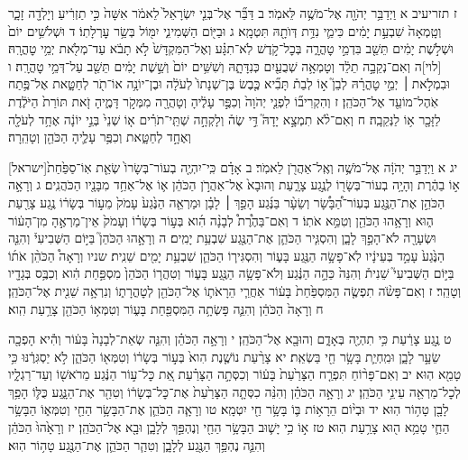 \documentclass[twoside, openany, parskip=half, 11pt]{book}
\begin{document}
ז תזריעיב א וַיְדַבֵּ֥ר יְהֹוָ֖ה אֶל־מֹשֶׁ֥ה לֵּאמֹֽר׃ ב דַּבֵּ֞ר אֶל־בְּנֵ֤י יִשְׂרָאֵל֙ לֵאמֹ֔ר אִשָּׁה֙ כִּ֣י תַזְרִ֔יעַ וְיָלְדָ֖ה זָכָ֑ר וְטָֽמְאָה֙ שִׁבְעַ֣ת יָמִ֔ים כִּימֵ֛י נִדַּ֥ת דְּוֺתָ֖הּ תִּטְמָֽא׃ ג וּבַיּ֖וֹם הַשְּׁמִינִ֑י יִמּ֖וֹל בְּשַׂ֥ר עׇרְלָתֽוֹ׃ ד וּשְׁלֹשִׁ֥ים יוֹם֙ וּשְׁלֹ֣שֶׁת יָמִ֔ים תֵּשֵׁ֖ב בִּדְמֵ֣י טׇהֳרָ֑ה בְּכׇל־קֹ֣דֶשׁ לֹֽא־תִגָּ֗ע וְאֶל־הַמִּקְדָּשׁ֙ לֹ֣א תָבֹ֔א עַד־מְלֹ֖את יְמֵ֥י טׇהֳרָֽהּ׃ [לוי]ה וְאִם־נְקֵבָ֣ה תֵלֵ֔ד וְטָמְאָ֥ה שְׁבֻעַ֖יִם כְּנִדָּתָ֑הּ וְשִׁשִּׁ֥ים יוֹם֙ וְשֵׁ֣שֶׁת יָמִ֔ים תֵּשֵׁ֖ב עַל־דְּמֵ֥י טׇהֳרָֽה׃ ו וּבִמְלֹ֣את ׀ יְמֵ֣י טׇהֳרָ֗הּ לְבֵן֮ א֣וֹ לְבַת֒ תָּבִ֞יא כֶּ֤בֶשׂ בֶּן־שְׁנָתוֹ֙ לְעֹלָ֔ה וּבֶן־יוֹנָ֥ה אוֹ־תֹ֖ר לְחַטָּ֑את אֶל־פֶּ֥תַח אֹֽהֶל־מוֹעֵ֖ד אֶל־הַכֹּהֵֽן׃ ז וְהִקְרִיב֞וֹ לִפְנֵ֤י יְהֹוָה֙ וְכִפֶּ֣ר עָלֶ֔יהָ וְטָהֲרָ֖ה מִמְּקֹ֣ר דָּמֶ֑יהָ זֹ֤את תּוֹרַת֙ הַיֹּלֶ֔דֶת לַזָּכָ֖ר א֥וֹ לַנְּקֵבָֽה׃ ח וְאִם־לֹ֨א תִמְצָ֣א יָדָהּ֮ דֵּ֣י שֶׂה֒ וְלָקְחָ֣ה שְׁתֵּֽי־תֹרִ֗ים א֤וֹ שְׁנֵי֙ בְּנֵ֣י יוֹנָ֔ה אֶחָ֥ד לְעֹלָ֖ה וְאֶחָ֣ד לְחַטָּ֑את וְכִפֶּ֥ר עָלֶ֛יהָ הַכֹּהֵ֖ן וְטָהֵֽרָה׃

[ישראל]יג א וַיְדַבֵּ֣ר יְהֹוָ֔ה אֶל־מֹשֶׁ֥ה וְאֶֽל־אַהֲרֹ֖ן לֵאמֹֽר׃ ב אָדָ֗ם כִּֽי־יִהְיֶ֤ה בְעוֹר־בְּשָׂרוֹ֙ שְׂאֵ֤ת אֽוֹ־סַפַּ֙חַת֙ א֣וֹ בַהֶ֔רֶת וְהָיָ֥ה בְעוֹר־בְּשָׂר֖וֹ לְנֶ֣גַע צָרָ֑עַת וְהוּבָא֙ אֶל־אַהֲרֹ֣ן הַכֹּהֵ֔ן א֛וֹ אֶל־אַחַ֥ד מִבָּנָ֖יו הַכֹּהֲנִֽים׃ ג וְרָאָ֣ה הַכֹּהֵ֣ן אֶת־הַנֶּ֣גַע בְּעֽוֹר־הַ֠בָּשָׂ֠ר וְשֵׂעָ֨ר בַּנֶּ֜גַע הָפַ֣ךְ ׀ לָבָ֗ן וּמַרְאֵ֤ה הַנֶּ֙גַע֙ עָמֹק֙ מֵע֣וֹר בְּשָׂר֔וֹ נֶ֥גַע צָרַ֖עַת ה֑וּא וְרָאָ֥הוּ הַכֹּהֵ֖ן וְטִמֵּ֥א אֹתֽוֹ׃ ד וְאִם־בַּהֶ֩רֶת֩ לְבָנָ֨ה הִ֜וא בְּע֣וֹר בְּשָׂר֗וֹ וְעָמֹק֙ אֵין־מַרְאֶ֣הָ מִן־הָע֔וֹר וּשְׂעָרָ֖ה לֹא־הָפַ֣ךְ לָבָ֑ן וְהִסְגִּ֧יר הַכֹּהֵ֛ן אֶת־הַנֶּ֖גַע שִׁבְעַ֥ת יָמִֽים׃ ה וְרָאָ֣הוּ הַכֹּהֵן֮ בַּיּ֣וֹם הַשְּׁבִיעִי֒ וְהִנֵּ֤ה הַנֶּ֙גַע֙ עָמַ֣ד בְּעֵינָ֔יו לֹֽא־פָשָׂ֥ה הַנֶּ֖גַע בָּע֑וֹר וְהִסְגִּיר֧וֹ הַכֹּהֵ֛ן שִׁבְעַ֥ת יָמִ֖ים שֵׁנִֽית׃ שניו וְרָאָה֩ הַכֹּהֵ֨ן אֹת֜וֹ בַּיּ֣וֹם הַשְּׁבִיעִי֮ שֵׁנִית֒ וְהִנֵּה֙ כֵּהָ֣ה הַנֶּ֔גַע וְלֹא־פָשָׂ֥ה הַנֶּ֖גַע בָּע֑וֹר וְטִהֲר֤וֹ הַכֹּהֵן֙ מִסְפַּ֣חַת הִ֔וא וְכִבֶּ֥ס בְּגָדָ֖יו וְטָהֵֽר׃ ז וְאִם־פָּשֹׂ֨ה תִפְשֶׂ֤ה הַמִּסְפַּ֙חַת֙ בָּע֔וֹר אַחֲרֵ֧י הֵרָאֹת֛וֹ אֶל־הַכֹּהֵ֖ן לְטׇהֳרָת֑וֹ וְנִרְאָ֥ה שֵׁנִ֖ית אֶל־הַכֹּהֵֽן׃ ח וְרָאָה֙ הַכֹּהֵ֔ן וְהִנֵּ֛ה פָּשְׂתָ֥ה הַמִּסְפַּ֖חַת בָּע֑וֹר וְטִמְּא֥וֹ הַכֹּהֵ֖ן צָרַ֥עַת הִֽוא׃

ט נֶ֣גַע צָרַ֔עַת כִּ֥י תִהְיֶ֖ה בְּאָדָ֑ם וְהוּבָ֖א אֶל־הַכֹּהֵֽן׃ י וְרָאָ֣ה הַכֹּהֵ֗ן וְהִנֵּ֤ה שְׂאֵת־לְבָנָה֙ בָּע֔וֹר וְהִ֕יא הָפְכָ֖ה שֵׂעָ֣ר לָבָ֑ן וּמִֽחְיַ֛ת בָּשָׂ֥ר חַ֖י בַּשְׂאֵֽת׃ יא צָרַ֨עַת נוֹשֶׁ֤נֶת הִוא֙ בְּע֣וֹר בְּשָׂר֔וֹ וְטִמְּא֖וֹ הַכֹּהֵ֑ן לֹ֣א יַסְגִּרֶ֔נּוּ כִּ֥י טָמֵ֖א הֽוּא׃ יב וְאִם־פָּר֨וֹחַ תִּפְרַ֤ח הַצָּרַ֙עַת֙ בָּע֔וֹר וְכִסְּתָ֣ה הַצָּרַ֗עַת אֵ֚ת כׇּל־ע֣וֹר הַנֶּ֔גַע מֵרֹאשׁ֖וֹ וְעַד־רַגְלָ֑יו לְכׇל־מַרְאֵ֖ה עֵינֵ֥י הַכֹּהֵֽן׃ יג וְרָאָ֣ה הַכֹּהֵ֗ן וְהִנֵּ֨ה כִסְּתָ֤ה הַצָּרַ֙עַת֙ אֶת־כׇּל־בְּשָׂר֔וֹ וְטִהַ֖ר אֶת־הַנָּ֑גַע כֻּלּ֛וֹ הָפַ֥ךְ לָבָ֖ן טָה֥וֹר הֽוּא׃ יד וּבְי֨וֹם הֵרָא֥וֹת בּ֛וֹ בָּשָׂ֥ר חַ֖י יִטְמָֽא׃ טו וְרָאָ֧ה הַכֹּהֵ֛ן אֶת־הַבָּשָׂ֥ר הַחַ֖י וְטִמְּא֑וֹ הַבָּשָׂ֥ר הַחַ֛י טָמֵ֥א ה֖וּא צָרַ֥עַת הֽוּא׃ טז א֣וֹ כִ֥י יָשׁ֛וּב הַבָּשָׂ֥ר הַחַ֖י וְנֶהְפַּ֣ךְ לְלָבָ֑ן וּבָ֖א אֶל־הַכֹּהֵֽן׃ יז וְרָאָ֙הוּ֙ הַכֹּהֵ֔ן וְהִנֵּ֛ה נֶהְפַּ֥ךְ הַנֶּ֖גַע לְלָבָ֑ן וְטִהַ֧ר הַכֹּהֵ֛ן אֶת־הַנֶּ֖גַע טָה֥וֹר הֽוּא׃
\end{document}
